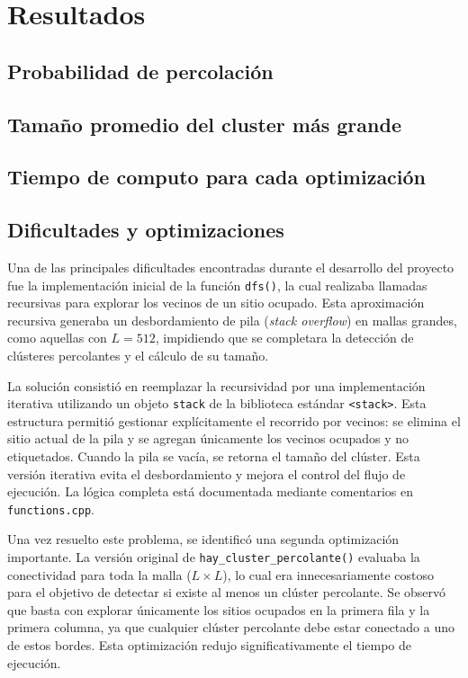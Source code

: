 \documentclass[%
 reprint,
 amsmath,amssymb,
 aps,
]{revtex4-2}
\begin{document}
\section{Resultados}

\subsection{Probabilidad de percolación}

\subsection{Tamaño promedio del cluster más grande}

\subsection{Tiempo de computo para cada optimización}

\subsection{Dificultades y optimizaciones}

Una de las principales dificultades encontradas durante el desarrollo del proyecto fue la implementación inicial de la función \texttt{dfs()}, la cual realizaba llamadas recursivas para explorar los vecinos de un sitio ocupado. Esta aproximación recursiva generaba un desbordamiento de pila (\textit{stack overflow}) en mallas grandes, como aquellas con \( L = 512 \), impidiendo que se completara la detección de clústeres percolantes y el cálculo de su tamaño.

La solución consistió en reemplazar la recursividad por una implementación iterativa utilizando un objeto \texttt{stack} de la biblioteca estándar \texttt{<stack>}. Esta estructura permitió gestionar explícitamente el recorrido por vecinos: se elimina el sitio actual de la pila y se agregan únicamente los vecinos ocupados y no etiquetados. Cuando la pila se vacía, se retorna el tamaño del clúster. Esta versión iterativa evita el desbordamiento y mejora el control del flujo de ejecución. La lógica completa está documentada mediante comentarios en \texttt{functions.cpp}.

Una vez resuelto este problema, se identificó una segunda optimización importante. La versión original de \texttt{hay\_cluster\_percolante()} evaluaba la conectividad para toda la malla (\( L \times L \)), lo cual era innecesariamente costoso para el objetivo de detectar si existe al menos un clúster percolante. Se observó que basta con explorar únicamente los sitios ocupados en la primera fila y la primera columna, ya que cualquier clúster percolante debe estar conectado a uno de estos bordes. Esta optimización redujo significativamente el tiempo de ejecución.
\end{document}
